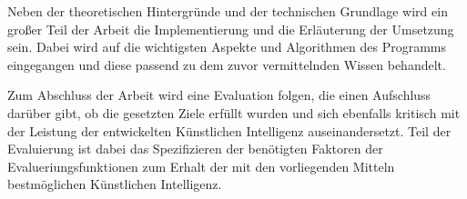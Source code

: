 Neben der theoretischen Hintergründe und der technischen Grundlage wird ein großer Teil der Arbeit die Implementierung und die Erläuterung der Umsetzung sein. Dabei wird auf die wichtigsten Aspekte und Algorithmen des Programms eingegangen und diese passend zu dem zuvor vermittelnden Wissen behandelt. 

Zum Abschluss der Arbeit wird eine Evaluation folgen, die einen Aufschluss darüber gibt, ob die gesetzten Ziele erfüllt wurden und sich ebenfalls kritisch mit der Leistung der entwickelten Künstlichen Intelligenz auseinandersetzt. Teil der Evaluierung ist dabei das Spezifizieren der benötigten Faktoren der Evalueriungsfunktionen zum Erhalt der mit den vorliegenden Mitteln bestmöglichen Künstlichen Intelligenz.






